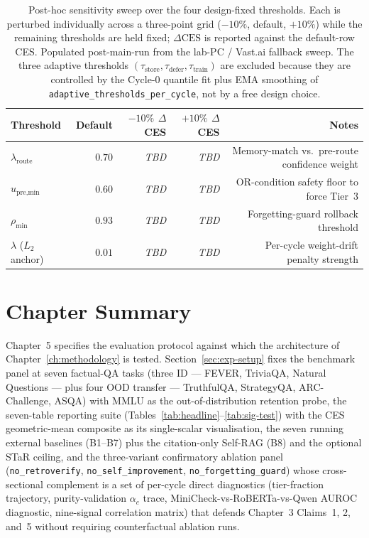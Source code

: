 \begin{table}[t]
\centering
\caption{Post-hoc sensitivity sweep over the four design-fixed thresholds. Each is perturbed individually across a three-point grid ($-10\%$, default, $+10\%$) while the remaining thresholds are held fixed; $\Delta\text{CES}$ is reported against the default-row CES. Populated post-main-run from the lab-PC / Vast.ai fallback sweep. The three adaptive thresholds $(\tau_{\text{store}}, \tau_{\text{defer}}, \tau_{\text{train}})$ are excluded because they are controlled by the Cycle-0 quantile fit plus EMA smoothing of \texttt{adaptive\_thresholds\_per\_cycle}, not by a free design choice.}
\label{tab:threshold-sensitivity}
\begin{tabular}{lrrrr}
\toprule
Threshold & Default & $-10\%$ $\Delta$CES & $+10\%$ $\Delta$CES & Notes \\
\midrule
$\lambda_{\text{route}}$ & $0.70$ & \textit{TBD} & \textit{TBD} & Memory-match vs.\ pre-route confidence weight \\
$u_{\text{pre,min}}$ & $0.60$ & \textit{TBD} & \textit{TBD} & OR-condition safety floor to force Tier~3 \\
$\rho_{\min}$ & $0.93$ & \textit{TBD} & \textit{TBD} & Forgetting-guard rollback threshold \\
$\lambda$ ($L_{2}$ anchor) & $0.01$ & \textit{TBD} & \textit{TBD} & Per-cycle weight-drift penalty strength \\
\bottomrule
\end{tabular}
\end{table}

\section{Chapter Summary}
\label{sec:ch5-summary}

Chapter~5 specifies the evaluation protocol against which the architecture of Chapter~\ref{ch:methodology} is tested. Section~\ref{sec:exp-setup} fixes the benchmark panel at seven factual-QA tasks (three ID --- FEVER, TriviaQA, Natural Questions --- plus four OOD transfer --- TruthfulQA, StrategyQA, ARC-Challenge, ASQA) with MMLU as the out-of-distribution retention probe, the seven-table reporting suite (Tables~\ref{tab:headline}--\ref{tab:sig-test}) with the CES geometric-mean composite as its single-scalar visualisation, the seven running external baselines (B1--B7) plus the citation-only Self-RAG (B8) and the optional STaR ceiling, and the three-variant confirmatory ablation panel (\texttt{no\_retroverify}, \texttt{no\_self\_improvement}, \texttt{no\_forgetting\_guard}) whose cross-sectional complement is a set of per-cycle direct diagnostics (tier-fraction trajectory, purity-validation $\alpha_{c}$ trace, MiniCheck-vs-RoBERTa-vs-Qwen AUROC diagnostic, nine-signal correlation matrix) that defends Chapter~3 Claims~1, 2, and~5 without requiring counterfactual ablation runs.

